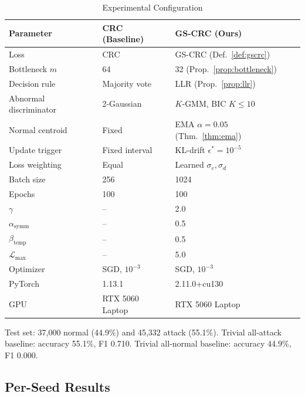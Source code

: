 \documentclass[conference]{IEEEtran}
\begin{document}
\medskip
\begin{table}[t]
\caption{Experimental Configuration}
\label{tab:config}
\centering
\begin{tabular}{lll}
\toprule
Parameter & CRC (Baseline) & GS-CRC (Ours)\\
\midrule
Loss & CRC & GS-CRC (Def.~\ref{def:gscrc})\\
Bottleneck $m$ & 64 & 32 (Prop.~\ref{prop:bottleneck})\\
Decision rule & Majority vote & LLR (Prop.~\ref{prop:llr})\\
Abnormal discriminator & 2-Gaussian & $K$-GMM, BIC $K \le 10$\\
Normal centroid & Fixed & EMA $\alpha=0.05$ (Thm.~\ref{thm:ema})\\
Update trigger & Fixed interval & KL-drift $\epsilon^*=10^{-5}$\\
Loss weighting & Equal & Learned $\sigma_e, \sigma_d$\\
Batch size & 256 & 1024\\
Epochs & 100 & 100\\
$\gamma$ & -- & 2.0\\
$\alpha_{\text{symm}}$ & -- & 0.5\\
$\beta_{\text{temp}}$ & -- & 0.5\\
$\mathcal{L}_{\max}$ & -- & 5.0\\
Optimizer & SGD, $10^{-3}$ & SGD, $10^{-3}$\\
PyTorch & 1.13.1 & 2.11.0+cu130\\
GPU & RTX 5060 Laptop & RTX 5060 Laptop\\
\bottomrule
\end{tabular}
\end{table}

Test set: 37,000 normal (44.9\%) and 45,332 attack (55.1\%).
Trivial all-attack baseline: accuracy 55.1\%, F1 0.710.
Trivial all-normal baseline: accuracy 44.9\%, F1 0.000.

\subsection{Per-Seed Results}
\end{document}
